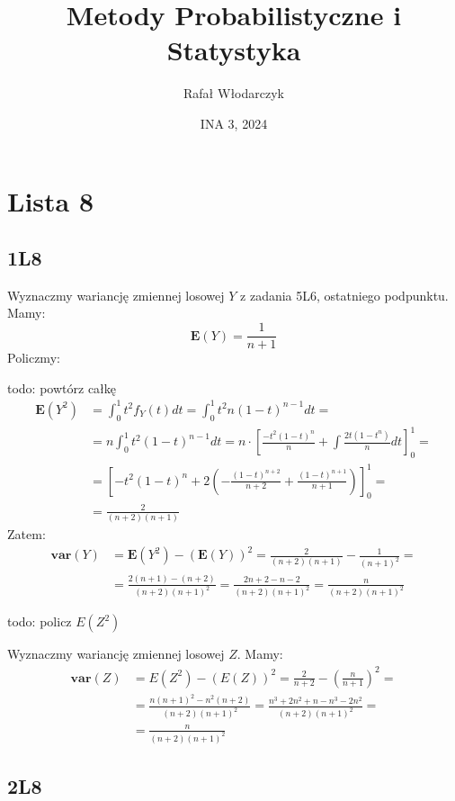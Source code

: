 \documentclass{article}
\title{Metody Probabilistyczne i Statystyka}
\author{Rafał Włodarczyk}
\date{INA 3, 2024}
\begin{document}
\maketitle

\tableofcontents

\newpage

\section{Lista 8}

\subsection{1L8}

Wyznaczmy wariancję zmiennej losowej $Y$ z zadania 5L6, ostatniego podpunktu. Mamy:
\[
    \mathbf{E}(Y) = \frac{1}{n+1}
\]
Policzmy:

todo: powtórz całkę
\setcounter{equation}{0}
\begin{align}
    \mathbf{E}(Y^2) &= \int_{0}^{1} t^2 f_Y(t) dt = \int_0^1 t^2 n(1-t)^{n-1} dt =\\
    &= n\int_0^1 t^2(1-t)^{n-1} dt = n \cdot\left[\frac{-t^2(1-t)^n}{n} + \int \frac{2t(1-t^n)}{n} dt  \right]_0^1 =\\
    &= \left[-t^2(1-t)^n + 2\left(-\frac{(1-t)^{n+2}}{n+2} + \frac{(1-t)^{n+1}}{n+1} \right) \right]_0^1 =\\
    &= \frac{2}{(n+2)(n+1)}
\end{align}
Zatem:
\begin{align}
    \mathbf{var}(Y) &= \mathbf{E}(Y^2) - (\mathbf{E}(Y))^2
    = \frac{2}{(n+2)(n+1)} - \frac{1}{(n+1)^2} =\\ 
    &= \frac{2(n+1) - (n+2)}{(n+2)(n+1)^2} 
    = \frac{2n+2-n-2}{(n+2)(n+1)^2} 
    = \frac{n}{(n+2)(n+1)^2}
\end{align}

todo: policz $E(Z^2)$

\noindent
Wyznaczmy wariancję zmiennej losowej $Z$. Mamy:
\begin{align}
    \mathbf{var}(Z) &= E(Z^2)-(E(Z))^2 
    = \frac{2}{n+2} - \left(\frac{n}{n+1}\right)^2 =\\
    &= \frac{n(n+1)^2 - n^2(n+2)}{(n+2)(n+1)^2}
    = \frac{n^3 + 2n^2 + n - n^3 - 2n^2}{(n+2)(n+1)^2} =\\
    &= \frac{n}{(n+2)(n+1)^2}
\end{align}

\subsection{2L8}
\end{document}
